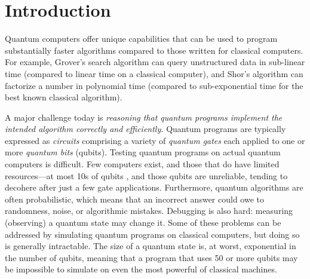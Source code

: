 \section{Introduction}
\label{sec:intro}



Quantum computers offer unique capabilities that can be used to
program substantially faster algorithms compared to those written for
classical computers. For example, Grover's search algorithm \cite{grover1996,grover1997}
can query unstructured data in sub-linear time (compared to linear
time on a classical computer), and Shor's algorithm \cite{shors} can factorize a
number in polynomial time (compared to sub-exponential time for the
best known classical algorithm). 


A major challenge today is \emph{reasoning that quantum programs implement
the intended algorithm correctly and efficiently.}
Quantum programs are typically expressed as \emph{circuits} comprising
a variety of \emph{quantum gates} each applied to one or more
\emph{quantum bits} (qubits). 
Testing quantum programs on actual quantum computers is difficult.
Few computers exist, and those that do have limited resources---at most 10s of qubits \cite{quantumcomputercurrent1,quantumcomputercurrent2}, 
and those qubits are unreliable, tending to decohere after just a few gate applications. 
Furthermore, quantum algorithms are often probabilistic, which
means that an incorrect answer could owe to
randomness, noise, or algorithmic mistakes. Debugging is also hard:
measuring (observing) a quantum state may change it. 
Some of these problems can be addressed by simulating quantum
programs on classical computers, but doing so
is generally intractable. The size of a quantum state is, at worst,
exponential in the number of qubits, meaning that a program that uses
50 or more qubits may be impossible to simulate on even the most powerful
of classical machines.

